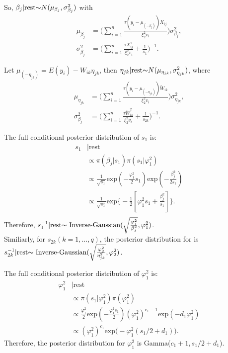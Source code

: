 \documentclass[12pt]{article}
\begin{document}
So, $\beta_j|\text{rest}{\thicksim} N(\mu_{\beta_j}, \sigma_{\beta_j}^2)$ with
\begin{equation*}
\begin{aligned}
\mu_{\beta_j} &= \big(\sum_{i=1}^{n}\frac{\tau(y_i-\mu_{(-\beta_j)})X_{ij}}{\xi_2^2 v_i}\big)\sigma_{\beta_j}^2,\\
\sigma_{\beta_j}^{2} &= \big( \sum_{i=1}^{n} \frac{\tau X_{ij}^2}{\xi_2^2 v_i}+\frac{1}{s_1}\big)^{-1}.
\end{aligned}
\end{equation*}

Let $\mu_{(-\eta_{jk})}=E(y_i)-W_{ik}\eta_{jk}$, then $\eta_{jk}|\text{rest}{\thicksim}  N(\mu_{\eta_{jk}}, \sigma_{\eta_{jk}}^2)$, where 
\begin{equation*}
\begin{aligned}
\mu_{\eta_{jk}} &= \big(\sum_{i=1}^{n}\frac{\tau(y_i-\mu_{(-\eta_{jk})})\tilde{W}_{ik}}{\xi_2^2 v_i}\big)\sigma_{\eta_{jk}}^2,\\
\sigma_{\beta_j}^{2} &= \big( \sum_{i=1}^{n} \frac{\tau \tilde{W}_{ik}^2}{\xi_2^2 v_i}+\frac{1}{s_{2k}}\big)^{-1}.
\end{aligned}
\end{equation*}

The full conditional posterior distribution of $s_1$ is:
\begin{equation*}
\begin{aligned}
s_{1}&|\text{rest} \\
&\propto \pi(\beta_{j}|s_1) \pi(s_1|\varphi_{1}^{2})\\
&\propto \frac{1}{\sqrt{s_1}} \text{exp}(-\frac{\varphi_{1}^{2}}{2} s_1) \text{exp}(-\frac{\beta_{j}^{2}}{2 s_1})\\
&\propto \frac{1}{\sqrt{s_1}} \text{exp} \Big\{ -\frac{1}{2}[\varphi_{1}^{2} s_1 + \frac{\beta_{j}^{2}}{s_1} ]  \}.\\
\end{aligned}
\end{equation*}
Therefore, $s_1^{-1}|\text{rest}{\thicksim} \text{ Inverse-Gaussian}(\sqrt{\frac{\varphi_1^2}{\beta_j^2}}, \varphi_1^2)$.\\

Similiarly, for $s_{2k} (k=1,\dots,q)$, the posterior distribution for is $s_{2k}^{-1}|\text{rest}{\thicksim} \text{ Inverse-Gaussian}(\sqrt{\frac{\varphi_2^2}{\eta_{jk}^2}}, \varphi_2^2)$.\par

The full conditional posterior distribution of $\varphi_1^2$ is:
\begin{equation*}
\begin{aligned}
\varphi_1^2&|\text{rest} \\
&\propto \pi(s_1|\varphi_1^2)\pi(\varphi_1^2)\\
&\propto \frac{\varphi_1^2}{2} \text{exp}(-\frac{\varphi_1^2 s_1}{2})(\varphi_1^2)^{c_1-1}\text{exp}(-d_1\varphi_1^2)\\
&\propto (\varphi_1^2)^{c_1} \text{exp}\Big(- \varphi_1^2(s_1/2+d_1)\Big).
\end{aligned}
\end{equation*}
Therefore, the posterior distribution for $\varphi_1^2$ is Gamma($c_1+1, s_1/2+d_1$).\par
\end{document}
